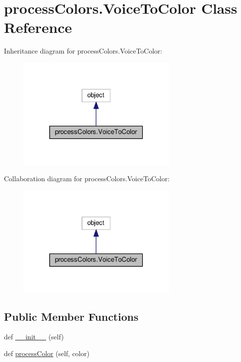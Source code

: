 \hypertarget{classprocessColors_1_1VoiceToColor}{}\section{process\+Colors.\+Voice\+To\+Color Class Reference}
\label{classprocessColors_1_1VoiceToColor}


Inheritance diagram for process\+Colors.\+Voice\+To\+Color\+:
\nopagebreak
\begin{figure}[H]
\begin{center}
\leavevmode
\includegraphics[width=222pt]{classprocessColors_1_1VoiceToColor__inherit__graph}
\end{center}
\end{figure}


Collaboration diagram for process\+Colors.\+Voice\+To\+Color\+:
\nopagebreak
\begin{figure}[H]
\begin{center}
\leavevmode
\includegraphics[width=222pt]{classprocessColors_1_1VoiceToColor__coll__graph}
\end{center}
\end{figure}
\subsection*{Public Member Functions}
\begin{DoxyCompactItemize}
\item 
def \hyperlink{classprocessColors_1_1VoiceToColor_abe7cd55778b568c1902f04d1fb6f83f1}{\+\_\+\+\_\+init\+\_\+\+\_\+} (self)
\item 
def \hyperlink{classprocessColors_1_1VoiceToColor_a76d0439d776fc090dd47bdfad6dbabd7}{process\+Color} (self, color)
\end{DoxyCompactItemize}
